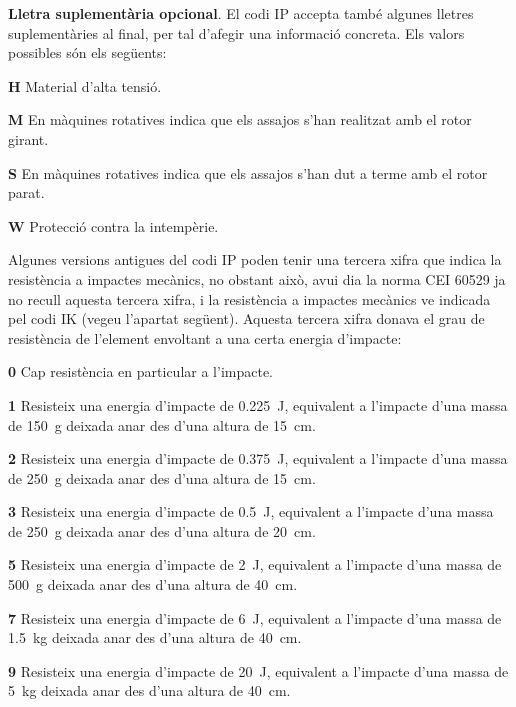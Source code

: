 \textbf{Lletra suplementària opcional}. El codi IP accepta també algunes
lletres suplementàries al final, per tal d'afegir una informació concreta. Els valors
possibles són els següents:
\begin{list}{}
   {\setlength{\labelwidth}{10mm} \setlength{\leftmargin}{10mm} \setlength{\labelsep}{2mm}}
   \item[\textbf{H}] Material d'alta tensió.
   \item[\textbf{M}] En màquines rotatives indica que els assajos s'han realitzat amb el
    rotor girant.
   \item[\textbf{S}] En màquines rotatives indica que els assajos s'han dut a terme amb el
    rotor parat.
   \item[\textbf{W}] Protecció contra la intempèrie.
\end{list}


Algunes versions antigues del codi IP poden tenir una tercera xifra que indica la resistència a impactes mecànics, no obstant això, avui  dia la norma CEI 60529 ja no recull aquesta tercera xifra, i la resistència a impactes mecànics ve indicada pel codi IK (vegeu l'apartat següent). Aquesta tercera xifra donava el grau de resistència de l'element envoltant a una certa energia d'impacte:
\begin{list}{}
   {\setlength{\labelwidth}{10mm} \setlength{\leftmargin}{10mm} \setlength{\labelsep}{2mm}}
   \item[\textbf{0}] Cap resistència en particular a l'impacte.
   \item[\textbf{1}] Resisteix una energia d'impacte de \qty{0,225}{J}, equivalent a l'impacte d'una massa de \qty{150}{g} deixada anar des d'una altura de \qty{15}{cm}.
   \item[\textbf{2}] Resisteix una energia d'impacte de \qty{0,375}{J}, equivalent a l'impacte d'una massa de \qty{250}{g} deixada anar des d'una altura de \qty{15}{cm}.
   \item[\textbf{3}] Resisteix una energia d'impacte de \qty{0,5}{J}, equivalent a l'impacte d'una massa de \qty{250}{g} deixada anar des d'una altura de \qty{20}{cm}.
   \item[\textbf{5}] Resisteix una energia d'impacte de \qty{2}{J}, equivalent a l'impacte d'una massa de \qty{500}{g} deixada anar des d'una altura de \qty{40}{cm}.
   \item[\textbf{7}] Resisteix una energia d'impacte de \qty{6}{J}, equivalent a l'impacte d'una massa de \qty{1,5}{kg} deixada anar des d'una altura de \qty{40}{cm}.
   \item[\textbf{9}]Resisteix una energia d'impacte de \qty{20}{J}, equivalent a l'impacte d'una massa de \qty{5}{kg} deixada anar des d'una altura de \qty{40}{cm}.
\end{list}

